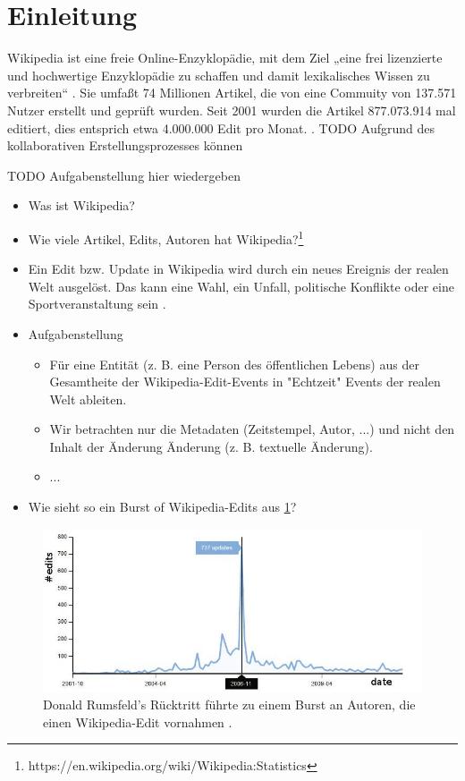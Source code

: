 \section{Einleitung}
Wikipedia ist eine freie Online-Enzyklopädie, mit dem Ziel „eine frei lizenzierte und hochwertige Enzyklopädie zu schaffen und damit lexikalisches Wissen zu verbreiten“ \cite{wales.}. Sie umfaßt 74 Millionen Artikel, die von eine Commuity von 137.571 Nutzer erstellt und geprüft wurden. Seit 2001 wurden die Artikel 877.073.914 mal editiert, dies entsprich etwa 4.000.000 Edit pro Monat. \cite{wikistat}.
TODO
Aufgrund des kollaborativen Erstellungsprozesses können \cite{wikipedia.}

TODO
Aufgabenstellung hier wiedergeben

\begin{itemize}
    \item Was ist Wikipedia?
    \item Wie viele Artikel, Edits, Autoren hat Wikipedia?\footnote{https://en.wikipedia.org/wiki/Wikipedia:Statistics}
    \item Ein Edit bzw. Update in Wikipedia wird durch ein neues Ereignis der realen Welt ausgelöst. Das kann eine Wahl,
    ein Unfall, politische Konflikte oder eine Sportveranstaltung sein \cite{10.1007978-3-642-36973-5_22}.
    \item Aufgabenstellung
    \begin{itemize}
        \item Für eine Entität (z. B. eine Person des öffentlichen Lebens) aus der Gesamtheite der Wikipedia-Edit-Events in "Echtzeit"
        Events der realen Welt ableiten.
        \item Wir betrachten nur die Metadaten (Zeitstempel, Autor, ...) und nicht den Inhalt der Änderung Änderung (z. B. textuelle Änderung).
        \item ...
    \end{itemize}
    \item Wie sieht so ein Burst of Wikipedia-Edits aus \ref{fig:donald_rumsfelds_resignation_burst}?
\end{itemize}


\begin{figure}[h]
    \includegraphics[width=.5\textwidth]{images/Extracting_EventRelated_Information_from_Article.jpg}
    \caption{Donald Rumsfeld’s Rücktritt führte zu einem Burst an Autoren, die einen Wikipedia-Edit vornahmen \cite{10.1007978-3-642-36973-5_22}.}
    \label{fig:donald_rumsfelds_resignation_burst}
\end{figure}